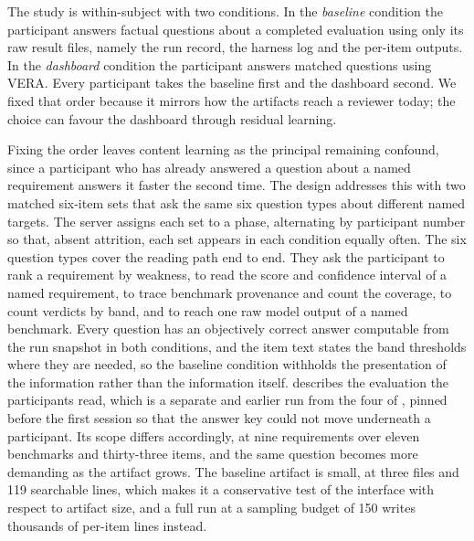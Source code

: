 \documentclass[10pt,conference,a4paper]{IEEEtran}
\begin{document}
The study is within-subject with two conditions.
In the \emph{baseline} condition the participant answers factual questions about a completed evaluation using only its raw result files, namely the run record, the harness log and the per-item outputs.
In the \emph{dashboard} condition the participant answers matched questions using VERA.
Every participant takes the baseline first and the dashboard second.
We fixed that order because it mirrors how the artifacts reach a reviewer today; the choice can favour the dashboard through residual learning.

Fixing the order leaves content learning as the principal remaining confound, since a participant who has already answered a question about a named requirement answers it faster the second time.
The design addresses this with two matched six-item sets that ask the same six question types about different named targets.
The server assigns each set to a phase, alternating by participant number so that, absent attrition, each set appears in each condition equally often.
The six question types cover the reading path end to end.
They ask the participant to rank a requirement by weakness, to read the score and confidence interval of a named requirement, to trace benchmark provenance and count the coverage, to count verdicts by band, and to reach one raw model output of a named benchmark.
Every question has an objectively correct answer computable from the run snapshot in both conditions, and the item text states the band thresholds where they are needed, so the baseline condition withholds the presentation of the information rather than the information itself.
 describes the evaluation the participants read, which is a separate and earlier run from the four of , pinned before the first session so that the answer key could not move underneath a participant.
Its scope differs accordingly, at nine requirements over eleven benchmarks and thirty-three items, and the same question becomes more demanding as the artifact grows.
The baseline artifact is small, at three files and 119 searchable lines, which makes it a conservative test of the interface with respect to artifact size, and a full run at a sampling budget of 150 writes thousands of per-item lines instead.
\end{document}

